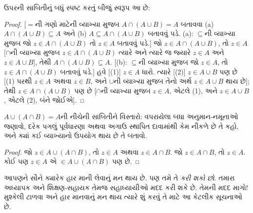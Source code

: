 ઉપરની સાબિતીનું બધું સ્પષ્ટ કરતું બીજું સ્વરૂપ આ છે:
\begin{proof}{}
[$=$ની ગણો માટેની વ્યાખ્યા મુજબ $A \cap (A \cup B) = A$
બતાવવા (a) $A \cap (A \cup B) \subseteq A$ અને
(b) $A \subseteq A \cap (A \cup B)$ બતાવવું પડે. (a): $\subseteq$ની વ્યાખ્યા
મુજબ જો $z \in A \cap (A \cup B)$ તો $z \in A$ બતાવવું પડે.]
જો $z \in A
\cap (A \cup B)$, તો $z \in A$ [$\cap$ની વ્યાખ્યા મુજબ
$z
  \in A \cap (A \cup B)$ ત્યારે અને ત્યારે જ જ્યારે
$z \in A$ અને $z \in A \cup B$], તેથી $A
\cap (A \cup B) \subseteq A$. [(b): $\subseteq$ની વ્યાખ્યા
મુજબ જો $z \in A$, તો $z \in A \cap (A \cup B)$ બતાવવું પડે.]
હવે [(1)] $z \in A$ ધારો. ત્યારે [(2)] $z \in A \cup B$ પણ છે
[(1) પરથી $z \in A$ અથવા $z \in B$, અને $\cup$ની વ્યાખ્યા
મુજબ તેનો અર્થ $z
  \in A \cup B$ થાય છે]; તેથી $z \in A \cap (A \cup B)$ પણ
છે [$\cap$ની વ્યાખ્યા મુજબ $z \in A$, એટલે (1), અને
$z
  \in A \cup B$, એટલે (2), બંને જોઈએ].
\end{proof}

\begin{prob}
$A \cup (A \cap B) = A$ની નીચેની સાબિતીને વિસ્તારો:
વપરાયેલા બધા અનુમાન-નમૂનાઓ જણાવો, દરેક પગલું પૂર્વધારણા
અથવા અગાઉ સ્થાપિત દાવામાંથી કેમ નીકળે છે તે કહો, અને
ક્યાં કઈ વ્યાખ્યાનો ઉપયોગ થાય છે તે બતાવો.
\begin{proof}
  જો $z \in A \cup (A \cap B)$, તો $z \in A$ અથવા
  $z \in A \cap B$. જો $z \in A \cap B$, તો $z \in A$.
  કોઈ પણ $z \in A$ એ $\in A \cup (A
  \cap B)$ પણ છે.
\end{proof}
\end{prob}
\endgroup


\begingroup
\makeatletter{}\makeatother


\label{guunit:OLP-0611}


આપણને સૌને ક્યારેક હાર માની લેવાનું મન થાય છે. પણ તમે તે
\emph{કરી શકો છો}. તમારા અધ્યાપક અને શિક્ષણ-સહાયક તેમજ
સહાધ્યાયીઓ મદદ કરી શકે છે. તેમની મદદ માગો!{} મુશ્કેલી
ટાળવા અને હાર માનવાનું મન થાય ત્યારે શું કરવું તે માટે
આ કેટલીક સૂચનાઓ છે.

